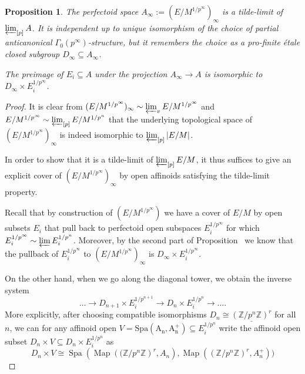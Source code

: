 \documentclass[10pt,oneside]{amsart}
\newtheorem{proposition}[theorem]{Proposition}
\theoremstyle{definition}
\begin{document}
	\begin{proposition}\label{tilde limit of tilde limits of partial towers is tilde limit of whole tower}
		The perfectoid space  $A_\infty:=(E/M^{1/p^\infty})_\infty$ is a tilde-limit of $\varprojlim_{[p]}A$.	It is independent up to unique isomorphism of the choice of partial anticanonical $\Gamma_0(p^\infty)$-structure, but it remembers the choice as a pro-finite \'etale closed subgroup $D_\infty \subseteq A_\infty$. 
		
		The preimage of $E_i\subseteq A$ under the projection $A_\infty \rightarrow A$ is isomorphic to $D_\infty \times E_i^{1/p^\infty}$.
	\end{proposition}
	\begin{proof}
	It is clear from $(E/M^{1/p^\infty})_\infty \sim \varprojlim_v E/M^{1/p^\infty}$ and $E/M^{1/p^\infty}\sim \varprojlim_{[p]} E/M^{1/p^n}$ that the underlying topological space of $(E/M^{1/p^\infty})_\infty$ is indeed isomorphic to $\varprojlim_{[p]}|E/M|$.

	In order to show that it is a tilde-limit of $\varprojlim_{[p]}E/M$, it thus suffices to give an explicit cover of $(E/M^{1/p^\infty})_\infty$ by open affinoids satisfying the tilde-limit property. 
	
	Recall that by construction of $(E/M^{1/p^\infty})$ we have a cover of $E/M$ by open subsets $E_i$ that pull back to perfectoid open subspaces $E_i^{1/p^\infty}$ for which $E_i^{1/p^\infty}\sim \varprojlim E_i^{1/p^n}$.
	 Moreover, by the second part of Proposition~\label{horizontal etale map pulls back to vertical limit} we know that the pullback of $E_i^{1/p^\infty}$ to $(E/M^{1/p^\infty})_\infty$ is $D_\infty \times E_i^{1/p^\infty}$. 
	 
	 On the other hand, when we go along the diagonal tower, we obtain the inverse system 
	 \[\dots\rightarrow D_{n+1}\times E_i^{1/p^{n+1}}\rightarrow D_{n}\times E_i^{1/p^{n}}\rightarrow \dots.\]
	 More explicitly, after choosing compatible isomorphisms $D_n\cong \underline{(\mathbb Z/p^n\mathbb Z)^r}$ for all $n$, we can for any affinoid open $V=\operatorname{Spa(A_n,A_n^{+})}\subseteq E_i^{1/p^{n}}$ write the affinoid open subset $D_n\times V\subseteq D_n\times E_i^{1/p^{n}}$ as
	 \[D_{n}\times V \cong \operatorname{Spa}(\operatorname{Map}(\mathbb (\mathbb Z/p^n\mathbb Z)^r,A_n),\operatorname{Map}((\mathbb Z/p^n\mathbb Z)^r,A_n^{+}))\]
	 

\end{proof}
\end{document}
